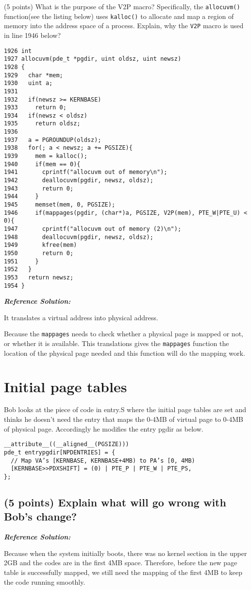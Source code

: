 \documentclass[]{article}
\begin{document}
(5 points) What is the purpose of the V2P macro? Specifically, the
\texttt{allocuvm()} function(see the listing below) uses
\texttt{kalloc()} to allocate and map a region of memory into the
address space of a process. Explain, why the \texttt{V2P} macro is used
in line 1946 below?

\begin{verbatim}
1926 int
1927 allocuvm(pde_t *pgdir, uint oldsz, uint newsz)
1928 {
1929   char *mem;
1930   uint a;
1931
1932   if(newsz >= KERNBASE)
1933     return 0;
1934   if(newsz < oldsz)
1935     return oldsz;
1936
1937   a = PGROUNDUP(oldsz);
1938   for(; a < newsz; a += PGSIZE){
1939     mem = kalloc();
1940     if(mem == 0){
1941       cprintf("allocuvm out of memory\n");
1942       deallocuvm(pgdir, newsz, oldsz);
1943       return 0;
1944     }
1945     memset(mem, 0, PGSIZE);
1946     if(mappages(pgdir, (char*)a, PGSIZE, V2P(mem), PTE_W|PTE_U) < 0){
1947       cprintf("allocuvm out of memory (2)\n");
1948       deallocuvm(pgdir, newsz, oldsz);
1949       kfree(mem)
1950       return 0;
1951     }
1952   }
1953   return newsz;
1954 }
\end{verbatim}

\textbf{\emph{Reference Solution:}}

It translates a virtual address into physical address.

Because the \texttt{mappages} needs to check whether a physical page is
mapped or not, or whether it is available. This translations gives the
\texttt{mappages} function the location of the physical page needed and
this function will do the mapping work.

\hypertarget{initial-page-tables}{%
\section{Initial page tables}\label{initial-page-tables}}

Bob looks at the piece of code in entry.S where the initial page tables
are set and thinks he doesn't need the entry that maps the 0-4MB of
virtual page to 0-4MB of physical page. Accordingly he modifies the
entry pgdir as below.

\begin{verbatim}
__attribute__((__aligned__(PGSIZE)))
pde_t entrypgdir[NPDENTRIES] = {
  // Map VA’s [KERNBASE, KERNBASE+4MB) to PA’s [0, 4MB)
  [KERNBASE>>PDXSHIFT] = (0) | PTE_P | PTE_W | PTE_PS,
};
\end{verbatim}

\hypertarget{points-explain-what-will-go-wrong-with-bobs-change}{%
\subsection{(5 points) Explain what will go wrong with Bob's
change?}\label{points-explain-what-will-go-wrong-with-bobs-change}}

\textbf{\emph{Reference Solution:}}

Because when the system initially boots, there was no kernel section in
the upper 2GB and the codes are in the first 4MB space. Therefore,
before the new page table is successfully mapped, we still need the
mapping of the first 4MB to keep the code running smoothly.
\end{document}
